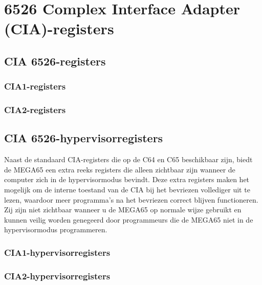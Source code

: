 \chapter{6526 Complex Interface Adapter (CIA)-registers}

\section{CIA 6526-registers}

\subsection*{CIA1-registers}


\subsection*{CIA2-registers}


\section{CIA 6526-hypervisorregisters}

Naast de standaard CIA-registers die op de C64 en C65 beschikbaar zijn, biedt de MEGA65 een extra reeks registers die alleen zichtbaar zijn wanneer de computer zich in de hypervisormodus bevindt. Deze extra registers maken het mogelijk om de interne toestand van de CIA bij het bevriezen vollediger uit te lezen, waardoor meer programma's na het bevriezen correct blijven functioneren. Zij zijn niet zichtbaar wanneer u de MEGA65 op normale wijze gebruikt en kunnen veilig worden genegeerd door programmeurs die de MEGA65 niet in de hypervisormodus programmeren.

\subsection*{CIA1-hypervisorregisters}


\subsection*{CIA2-hypervisorregisters}

